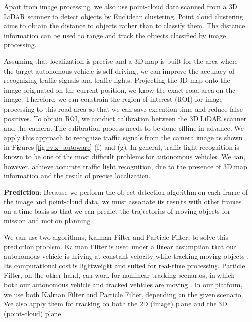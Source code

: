 Apart from image processing, we also use point-cloud data scanned from a
3D LiDAR scanner to detect objects by Euclidean clustering. 
Point cloud clustering aims to obtain the distance to objects rather
than to classify them.
The distance information can be used to range and track the objects
classified by image processing.

Assuming that localization is precise and a 3D map is built for the area
where the target autonomous vehicle is self-driving, we can improve the
accuracy of recognizing traffic signals and traffic lights.
Projecting the 3D map onto the image originated on the current position,
we know the exact road area on the image.
Therefore, we can constrain the region of interest (ROI) for image
processing to this road area so that we can save execution time and
reduce false positives.
To obtain ROI, we conduct calibration between the 3D LiDAR scanner and
the camera.
The calibration process needs to be done offline in advance.
We apply this approach to recognize traffic signals from the camera image as shown in Figures \ref{fig:rviz_autoware} (f) and (g).
In general, traffic light recognition is known to be one of the most
difficult problems for autonomous vehicles.
We can, however, achieve accurate traffic light recognition,
due to the presence of 3D map information and the result of precise
localization.



\textbf{Prediction}:
Because we perform the object-detection algorithm on each frame of the image and point-cloud data, we must associate its results with other frames on a time basis so that we can predict the trajectories of moving objects for mission and motion planning.

We can use two algorithms, Kalman Filter and Particle Filter, to solve this prediction problem.
Kalman Filter is used under a linear assumption that our autonomous vehicle is driving at constant velocity while tracking moving objects \cite{kalman1960new}.
Its computational cost is lightweight and suited for real-time processing.
Particle Filter, on the other hand, can work for nonlinear tracking scenarios, in which both our autonomous vehicle and tracked vehicles are moving \cite{arulampalam2002tutorial}.
In our platform, we use both Kalman Filter and Particle Filter, depending on the given scenario.
We also apply them for tracking on both the 2D (image) plane and the 3D (point-cloud) plane.


